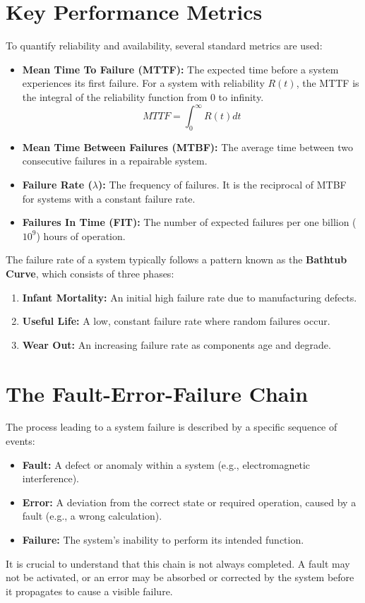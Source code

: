 \section{Key Performance Metrics}

To quantify reliability and availability, several standard metrics are used:
\begin{itemize}
    \item \textbf{Mean Time To Failure (MTTF):} The expected time before a system experiences its first failure. For a system with reliability $R(t)$, the MTTF is the integral of the reliability function from 0 to infinity.
    \begin{equation}
        MTTF = \int_{0}^{\infty} R(t)dt
    \end{equation}
    \item \textbf{Mean Time Between Failures (MTBF):} The average time between two consecutive failures in a repairable system.
    \item \textbf{Failure Rate ($\lambda$):} The frequency of failures. It is the reciprocal of MTBF for systems with a constant failure rate.
    \item \textbf{Failures In Time (FIT):} The number of expected failures per one billion ($10^9$) hours of operation.
\end{itemize}

The failure rate of a system typically follows a pattern known as the \textbf{Bathtub Curve}, which consists of three phases:
\begin{enumerate}
    \item \textbf{Infant Mortality:} An initial high failure rate due to manufacturing defects.
    \item \textbf{Useful Life:} A low, constant failure rate where random failures occur.
    \item \textbf{Wear Out:} An increasing failure rate as components age and degrade.
\end{enumerate}

\section{The Fault-Error-Failure Chain}
The process leading to a system failure is described by a specific sequence of events:
\begin{itemize}
    \item \textbf{Fault:} A defect or anomaly within a system (e.g., electromagnetic interference).
    \item \textbf{Error:} A deviation from the correct state or required operation, caused by a fault (e.g., a wrong calculation).
    \item \textbf{Failure:} The system's inability to perform its intended function.
\end{itemize}
It is crucial to understand that this chain is not always completed. A fault may not be activated, or an error may be absorbed or corrected by the system before it propagates to cause a visible failure.

